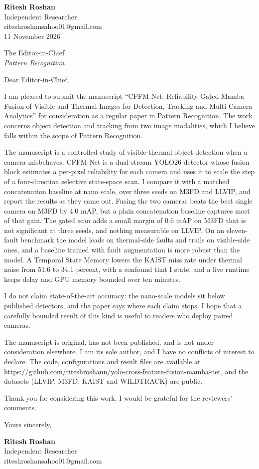 \documentclass[11pt]{article}
\begin{document}
\raggedright
\textbf{Ritesh Roshan}\\
Independent Researcher\\
riteshroshansahoo01@gmail.com\\
11 November 2026

The Editor-in-Chief\\
\textit{Pattern Recognition}

Dear Editor-in-Chief,

I am pleased to submit the manuscript ``CFFM-Net: Reliability-Gated Mamba Fusion of Visible and Thermal Images for Detection, Tracking and Multi-Camera Analytics'' for consideration as a regular paper in Pattern Recognition. The work concerns object detection and tracking from two image modalities, which I believe falls within the scope of Pattern Recognition.

The manuscript is a controlled study of visible-thermal object detection when a camera misbehaves. CFFM-Net is a dual-stream YOLO26 detector whose fusion block estimates a per-pixel reliability for each camera and uses it to scale the step of a four-direction selective state-space scan. I compare it with a matched concatenation baseline at nano scale, over three seeds on M3FD and LLVIP, and report the results as they came out. Fusing the two cameras beats the best single camera on M3FD by 4.0 mAP, but a plain concatenation baseline captures most of that gain. The gated scan adds a small margin of 0.6 mAP on M3FD that is not significant at three seeds, and nothing measurable on LLVIP. On an eleven-fault benchmark the model leads on thermal-side faults and trails on visible-side ones, and a baseline trained with fault augmentation is more robust than the model. A Temporal State Memory lowers the KAIST miss rate under thermal noise from 51.6 to 34.1 percent, with a confound that I state, and a live runtime keeps delay and GPU memory bounded over ten minutes.

I do not claim state-of-the-art accuracy: the nano-scale models sit below published detectors, and the paper says where each claim stops. I hope that a carefully bounded result of this kind is useful to readers who deploy paired cameras.

The manuscript is original, has not been published, and is not under consideration elsewhere. I am its sole author, and I have no conflicts of interest to declare. The code, configurations and result files are available at \url{https://github.com/riteshroshann/yolo-cross-feature-fusion-mamba-net}, and the datasets (LLVIP, M3FD, KAIST and WILDTRACK) are public.

Thank you for considering this work. I would be grateful for the reviewers' comments.

Yours sincerely,

\vspace{0.4em}
\textbf{Ritesh Roshan}\\
Independent Researcher\\
riteshroshansahoo01@gmail.com
\end{document}
